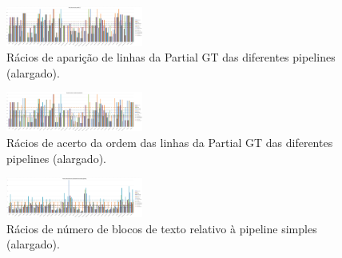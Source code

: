 \begin{figure}[H]
	\centering
	\includegraphics[angle=90,width=0.4\textwidth]{images/resultados/graph_pgt_hit_ratio.png}
	\caption{Rácios de aparição de linhas da Partial GT das diferentes pipelines (alargado).}
	\label{fig:graph_pgt_hit_ratio_large}
\end{figure}


\begin{figure}[H]
	\centering
	\includegraphics[angle=90,width=0.4\textwidth]{images/resultados/graph_pgt_correct_order_ratio.png}
	\caption{Rácios de acerto da ordem das linhas da Partial GT das diferentes pipelines (alargado).}
	\label{fig:graph_pgt_correct_order_ratio_large}
\end{figure}



\begin{figure}[H]
	\centering
	\includegraphics[angle=90,width=0.4\textwidth]{images/resultados/graph_text_block_ratio.png}
	\caption{Rácios de número de blocos de texto relativo à pipeline simples (alargado).}
	\label{fig:graph_text_block_ratio_large}
\end{figure}
